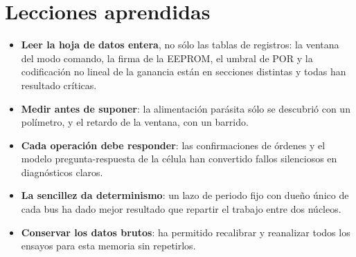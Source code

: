 \section{Lecciones aprendidas}

\begin{itemize}
  \item \textbf{Leer la hoja de datos entera}, no sólo las tablas de registros: la ventana del modo
        comando, la firma de la EEPROM, el umbral de POR y la codificación no lineal de la ganancia están
        en secciones distintas y todas han resultado críticas.
  \item \textbf{Medir antes de suponer}: la alimentación parásita sólo se descubrió con un polímetro, y
        el retardo de la ventana, con un barrido.
  \item \textbf{Cada operación debe responder}: las confirmaciones de órdenes y el modelo
        pregunta-respuesta de la célula han convertido fallos silenciosos en diagnósticos claros.
  \item \textbf{La sencillez da determinismo}: un lazo de periodo fijo con dueño único de cada bus ha
        dado mejor resultado que repartir el trabajo entre dos núcleos.
  \item \textbf{Conservar los datos brutos}: ha permitido recalibrar y reanalizar todos los ensayos para
        esta memoria sin repetirlos.
\end{itemize}
